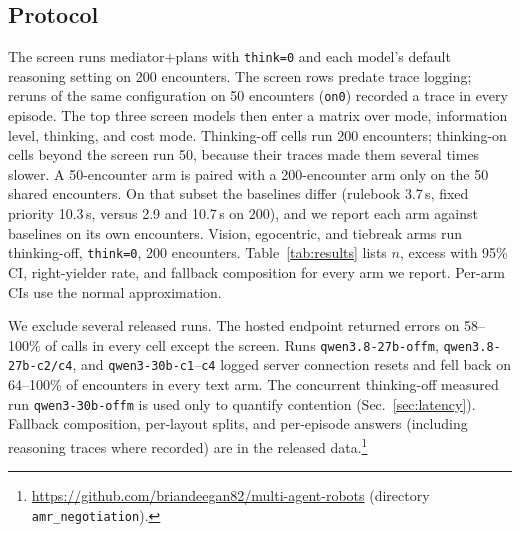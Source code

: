 \documentclass[journal]{IEEEtran}
\begin{document}
\subsection{Protocol}
\label{sec:protocol}
The screen runs mediator+plans with \texttt{think=0} and each model's default reasoning setting on 200 encounters. The screen rows predate trace logging; reruns of the same configuration on 50 encounters (\texttt{on0}) recorded a trace in every episode. The top three screen models then enter a matrix over mode, information level, thinking, and cost mode. Thinking-off cells run 200 encounters; thinking-on cells beyond the screen run 50, because their traces made them several times slower. A 50-encounter arm is paired with a 200-encounter arm only on the 50 shared encounters. On that subset the baselines differ (rulebook 3.7\,s, fixed priority 10.3\,s, versus 2.9 and 10.7\,s on 200), and we report each arm against baselines on its own encounters. Vision, egocentric, and tiebreak arms run thinking-off, \texttt{think=0}, 200 encounters. Table~\ref{tab:results} lists $n$, excess with 95\% CI, right-yielder rate, and fallback composition for every arm we report. Per-arm CIs use the normal approximation. %

We exclude several released runs. The hosted endpoint returned errors on 58--100\% of calls in every cell except the screen. Runs \texttt{qwen3.8-27b-offm}, \texttt{qwen3.8-27b-c2/c4}, and \texttt{qwen3-30b-c1}--\texttt{c4} logged server connection resets and fell back on 64--100\% of encounters in every text arm. The concurrent thinking-off measured run \texttt{qwen3-30b-offm} is used only to quantify contention (Sec.~\ref{sec:latency}). Fallback composition, per-layout splits, and per-episode answers (including reasoning traces where recorded) are in the released data.\footnote{\url{https://github.com/briandeegan82/multi-agent-robots} (directory \texttt{amr\_negotiation}). %
}
\end{document}
